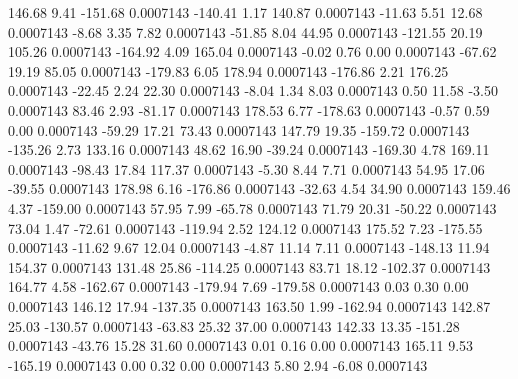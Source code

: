      146.68        9.41     -151.68     0.0007143
     -140.41        1.17      140.87     0.0007143
      -11.63        5.51       12.68     0.0007143
       -8.68        3.35        7.82     0.0007143
      -51.85        8.04       44.95     0.0007143
     -121.55       20.19      105.26     0.0007143
     -164.92        4.09      165.04     0.0007143
       -0.02        0.76        0.00     0.0007143
      -67.62       19.19       85.05     0.0007143
     -179.83        6.05      178.94     0.0007143
     -176.86        2.21      176.25     0.0007143
      -22.45        2.24       22.30     0.0007143
       -8.04        1.34        8.03     0.0007143
        0.50       11.58       -3.50     0.0007143
       83.46        2.93      -81.17     0.0007143
      178.53        6.77     -178.63     0.0007143
       -0.57        0.59        0.00     0.0007143
      -59.29       17.21       73.43     0.0007143
      147.79       19.35     -159.72     0.0007143
     -135.26        2.73      133.16     0.0007143
       48.62       16.90      -39.24     0.0007143
     -169.30        4.78      169.11     0.0007143
      -98.43       17.84      117.37     0.0007143
       -5.30        8.44        7.71     0.0007143
       54.95       17.06      -39.55     0.0007143
      178.98        6.16     -176.86     0.0007143
      -32.63        4.54       34.90     0.0007143
      159.46        4.37     -159.00     0.0007143
       57.95        7.99      -65.78     0.0007143
       71.79       20.31      -50.22     0.0007143
       73.04        1.47      -72.61     0.0007143
     -119.94        2.52      124.12     0.0007143
      175.52        7.23     -175.55     0.0007143
      -11.62        9.67       12.04     0.0007143
       -4.87       11.14        7.11     0.0007143
     -148.13       11.94      154.37     0.0007143
      131.48       25.86     -114.25     0.0007143
       83.71       18.12     -102.37     0.0007143
      164.77        4.58     -162.67     0.0007143
     -179.94        7.69     -179.58     0.0007143
        0.03        0.30        0.00     0.0007143
      146.12       17.94     -137.35     0.0007143
      163.50        1.99     -162.94     0.0007143
      142.87       25.03     -130.57     0.0007143
      -63.83       25.32       37.00     0.0007143
      142.33       13.35     -151.28     0.0007143
      -43.76       15.28       31.60     0.0007143
        0.01        0.16        0.00     0.0007143
      165.11        9.53     -165.19     0.0007143
        0.00        0.32        0.00     0.0007143
        5.80        2.94       -6.08     0.0007143
